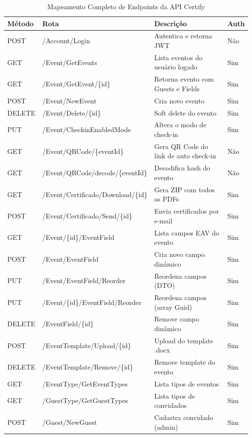 \begin{table}[htbp]
\centering
\caption{Mapeamento Completo de Endpoints da API Certify}
\footnotesize
\begin{tabular}{|l|l|p{5cm}|l|}
\hline
\textbf{Método} & \textbf{Rota} & \textbf{Descrição} & \textbf{Auth} \\ \hline
POST & /Account/Login & Autentica e retorna JWT & Não \\ \hline
GET & /Event/GetEvents & Lista eventos do usuário logado & Sim \\ \hline
GET & /Event/GetEvent/\{id\} & Retorna evento com Guests e Fields & Sim \\ \hline
POST & /Event/NewEvent & Cria novo evento & Sim \\ \hline
DELETE & /Event/Delete/\{id\} & Soft delete do evento & Sim \\ \hline
PUT & /Event/CheckinEnabledMode & Altera o modo de check-in & Sim \\ \hline
GET & /Event/QRCode/\{eventId\} & Gera QR Code do link de auto check-in & Não \\ \hline
GET & /Event/QRCode/decode/\{eventId\} & Decodifica hash do evento & Não \\ \hline
GET & /Event/Certificado/Download/\{id\} & Gera ZIP com todos os PDFs & Sim \\ \hline
POST & /Event/Certificado/Send/\{id\} & Envia certificados por e-mail & Sim \\ \hline
GET & /Event/\{id\}/EventField & Lista campos EAV do evento & Sim \\ \hline
POST & /Event/EventField & Cria novo campo dinâmico & Sim \\ \hline
PUT & /Event/EventField/Reorder & Reordena campos (DTO) & Sim \\ \hline
PUT & /Event/\{id\}/EventField/Reorder & Reordena campos (array Guid) & Sim \\ \hline
DELETE & /EventField/\{id\} & Remove campo dinâmico & Sim \\ \hline
POST & /EventTemplate/Upload/\{id\} & Upload do template .docx & Sim \\ \hline
DELETE & /EventTemplate/Remove/\{id\} & Remove template do evento & Sim \\ \hline
GET & /EventType/GetEventTypes & Lista tipos de eventos & Sim \\ \hline
GET & /GuestType/GetGuestTypes & Lista tipos de convidados & Sim \\ \hline
POST & /Guest/NewGuest & Cadastra convidado (admin) & Sim \\ \hline

\end{tabular}
\end{table}
